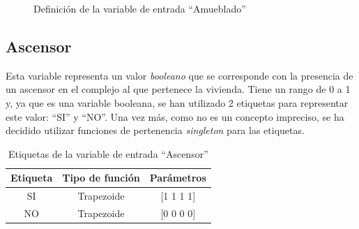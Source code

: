 \documentclass[12pt]{report} %
\begin{document}
        \begin{figure}[H]
            \centering
            \caption{Definición de la variable de entrada ``Amueblado''}
        \end{figure}

        \subsection{Ascensor}
        Esta variable representa un valor \textit{booleano} que se corresponde con la presencia de un ascensor en el complejo al que pertenece la vivienda. 
        Tiene un rango de 0 a 1 y, ya que es una variable booleana, se han utilizado 2 etiquetas para representar este valor: ``SI'' y ``NO''.
        Una vez más, como no es un concepto impreciso, se ha decidido utilizar funciones de pertenencia \textit{singleton} para las etiquetas.

        \begin{table}[h]
            \center
            \begin{tabular}{@{}ccc@{}}
                \toprule
                \textbf{Etiqueta} & \textbf{Tipo de función} & \textbf{Parámetros} \\
                \midrule
                SI & Trapezoide & [1 1 1 1] \\
                NO & Trapezoide & [0 0 0 0] \\
                \bottomrule
            \end{tabular}
            \caption{Etiquetas de la variable de entrada ``Ascensor''}
        \end{table}
\end{document}
